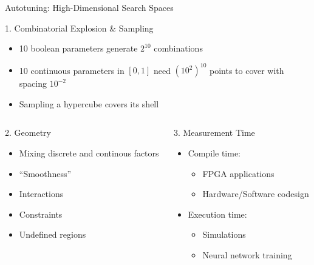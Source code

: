 \documentclass[10pt, compress, aspectratio=169, xcolor={table,usenames,dvipsnames}]{beamer}
\begin{document}
\begin{frame}[label={sec:org0ee62f9}]{Autotuning: High-Dimensional Search Spaces}
\begin{block}{1. \alert{Combinatorial Explosion \& Sampling}}
\begin{itemize}
\item 10 boolean parameters generate \(2^{10}\) combinations
\item 10 continuous parameters in \([0, 1]\)  need \((10^{2})^{10}\) points to cover with
spacing \(10^{-2}\)
\item Sampling a hypercube covers its shell
\end{itemize}
\end{block}

\begin{columns}
\begin{column}{0.5\columnwidth}
\begin{block}{2. \alert{Geometry}}
\begin{itemize}
\item Mixing discrete and continous factors
\item ``Smoothness''
\item Interactions
\item Constraints
\item Undefined regions
\end{itemize}
\end{block}
\end{column}

\begin{column}{0.5\columnwidth}
\begin{block}{3. \alert{Measurement Time}}
\begin{itemize}
\item Compile time:
\begin{itemize}
\item FPGA applications
\item Hardware/Software codesign
\end{itemize}
\item Execution time:
\begin{itemize}
\item Simulations
\item Neural network training
\end{itemize}
\end{itemize}
\end{block}
\end{column}
\end{columns}
\end{frame}
\end{document}
